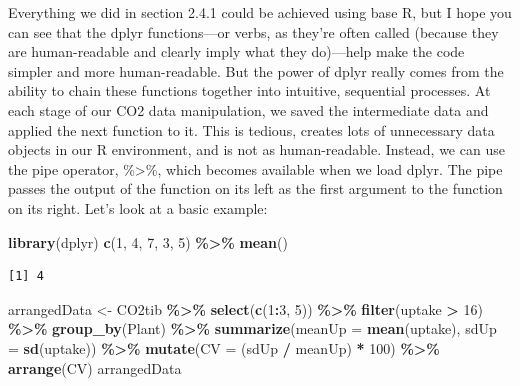 \documentclass[
]{article}
\newenvironment{Shaded}{\begin{snugshade}}{\end{snugshade}}
\newcommand{\AttributeTok}[1]{\textcolor[rgb]{0.13,0.29,0.53}{#1}}
\newcommand{\DecValTok}[1]{\textcolor[rgb]{0.00,0.00,0.81}{#1}}
\newcommand{\FunctionTok}[1]{\textcolor[rgb]{0.13,0.29,0.53}{\textbf{#1}}}
\newcommand{\NormalTok}[1]{#1}
\newcommand{\OtherTok}[1]{\textcolor[rgb]{0.56,0.35,0.01}{#1}}
\newcommand{\SpecialCharTok}[1]{\textcolor[rgb]{0.81,0.36,0.00}{\textbf{#1}}}
\begin{document}
Everything we did in section 2.4.1 could be achieved using base R, but I
hope you can see that the dplyr functions---or verbs, as they're often
called (because they are human-readable and clearly imply what they
do)---help make the code simpler and more human-readable. But the power
of dplyr really comes from the ability to chain these functions together
into intuitive, sequential processes. At each stage of our CO2 data
manipulation, we saved the intermediate data and applied the next
function to it. This is tedious, creates lots of unnecessary data
objects in our R environment, and is not as human-readable. Instead, we
can use the pipe operator, \%\textgreater\%, which becomes available
when we load dplyr. The pipe passes the output of the function on its
left as the first argument to the function on its right. Let's look at a
basic example:

\begin{Shaded}
\begin{Highlighting}[]
\FunctionTok{library}\NormalTok{(dplyr)}
\FunctionTok{c}\NormalTok{(}\DecValTok{1}\NormalTok{, }\DecValTok{4}\NormalTok{, }\DecValTok{7}\NormalTok{, }\DecValTok{3}\NormalTok{, }\DecValTok{5}\NormalTok{) }\SpecialCharTok{\%\textgreater{}\%} \FunctionTok{mean}\NormalTok{()}
\end{Highlighting}
\end{Shaded}

\begin{verbatim}
[1] 4
\end{verbatim}

\begin{Shaded}
\begin{Highlighting}[]
\NormalTok{arrangedData }\OtherTok{\textless{}{-}}\NormalTok{ CO2tib }\SpecialCharTok{\%\textgreater{}\%}
  \FunctionTok{select}\NormalTok{(}\FunctionTok{c}\NormalTok{(}\DecValTok{1}\SpecialCharTok{:}\DecValTok{3}\NormalTok{, }\DecValTok{5}\NormalTok{)) }\SpecialCharTok{\%\textgreater{}\%}
  \FunctionTok{filter}\NormalTok{(uptake }\SpecialCharTok{\textgreater{}} \DecValTok{16}\NormalTok{) }\SpecialCharTok{\%\textgreater{}\%}
  \FunctionTok{group\_by}\NormalTok{(Plant) }\SpecialCharTok{\%\textgreater{}\%}
  \FunctionTok{summarize}\NormalTok{(}\AttributeTok{meanUp =} \FunctionTok{mean}\NormalTok{(uptake), }\AttributeTok{sdUp =} \FunctionTok{sd}\NormalTok{(uptake)) }\SpecialCharTok{\%\textgreater{}\%}
  \FunctionTok{mutate}\NormalTok{(}\AttributeTok{CV =}\NormalTok{ (sdUp }\SpecialCharTok{/}\NormalTok{ meanUp) }\SpecialCharTok{*} \DecValTok{100}\NormalTok{) }\SpecialCharTok{\%\textgreater{}\%}
  \FunctionTok{arrange}\NormalTok{(CV)}
\NormalTok{arrangedData}
\end{Highlighting}
\end{Shaded}
\end{document}
